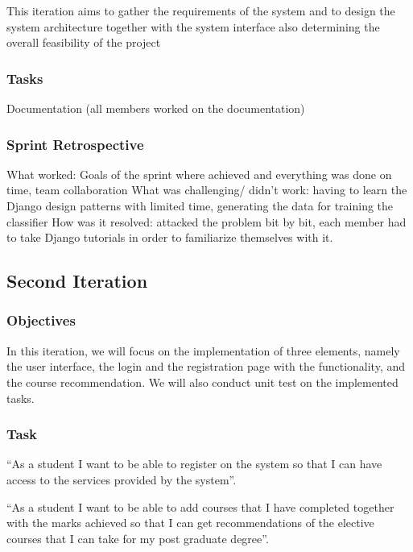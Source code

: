 \documentclass[10pt]{article}
\begin{document}
This iteration aims to gather the requirements of the system and to design the system architecture together with the system interface also determining the overall feasibility of the project

\subsubsection{Tasks}

Documentation (all members worked on the documentation)

\subsubsection{Sprint Retrospective}

What worked: Goals of the sprint where achieved and everything was done on time, team collaboration
What was challenging/ didn’t work:  having to learn the Django design patterns with limited time, generating the data for training the classifier 
How was it resolved: attacked the problem bit by bit, each member had to take Django tutorials in order to familiarize themselves with it.

\subsection{Second Iteration}

\subsubsection{Objectives}

In this iteration, we will focus on the implementation of three elements, namely the user interface, the login and the registration page with the functionality, and the course recommendation. We will also conduct unit test on the implemented tasks.

\subsubsection{Task}

“As a student I want to be able to register on the system so that I can have access to the services provided by the system”.

“As a student I want to be able to add courses that I have completed together with the marks achieved so that I can get recommendations of the elective courses that I can take for my post graduate degree”.
\end{document}
